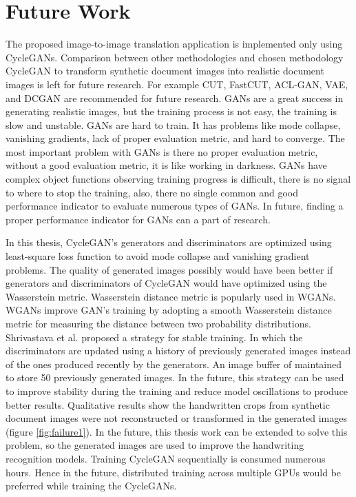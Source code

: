 \section{Future Work}\label{FutureWork}

The proposed image-to-image translation application is implemented only using \acp{CycleGAN}. Comparison between other methodologies and chosen methodology \ac{CycleGAN} to transform synthetic document images into realistic document images is left for future research. For example \ac{CUT}\cite{park2020contrastive}, \ac{FastCUT}\cite{park2020contrastive}, \ac{ACL-GAN}\cite{zhao2021unpaired}, \ac{VAE}\cite{Kingma_2019}, and \ac{DCGAN}\cite{radford2016unsupervised} are recommended for future research. \acp{GAN} are a great success in generating realistic images, but the training process is not easy, the training is slow and unstable. \acp{GAN} are hard to train. It has problems like mode collapse, vanishing gradients, lack of proper evaluation metric, and hard to converge. The most important problem with \acp{GAN} is there no proper evaluation metric, without a good evaluation metric, it is like working in darkness. \acp{GAN} have complex object functions observing training progress is difficult, there is no signal to where to stop the training, also, there no single common and good performance indicator to evaluate numerous types of \acp{GAN}. In future, finding a proper performance indicator for \acp{GAN} can a part of research. 

In this thesis, \ac{CycleGAN}'s generators and discriminators are optimized using least-square loss function\cite{mao2017squares} to avoid mode collapse and vanishing gradient problems. The quality of generated images possibly would have been better if generators and discriminators of \ac{CycleGAN} would have optimized using the Wasserstein metric. Wasserstein distance metric is popularly used in \acp{WGAN}. \acp{WGAN} improve \ac{GAN}'s training by adopting a smooth Wasserstein distance metric for measuring the distance between two probability distributions\cite{arjovsky2017wasserstein}. Shrivastava et al.\cite{shrivastava2017learning} proposed a strategy for stable training. In which the discriminators are updated using a history of previously generated images instead of the ones produced recently by the generators. An image buffer of maintained to store 50 previously generated images. In the future, this strategy can be used to improve stability during the training and reduce model oscillations to produce better results\cite{shrivastava2017learning}. Qualitative results show the handwritten crops from synthetic document images were not reconstructed or transformed in the generated images (figure \ref{fig:failure1}). In the future, this thesis work can be extended to solve this problem, so the generated images are used to improve the handwriting recognition models. Training \ac{CycleGAN} sequentially is consumed numerous hours. Hence in the future, distributed training across multiple GPUs would be preferred while training the \acp{CycleGAN}.

